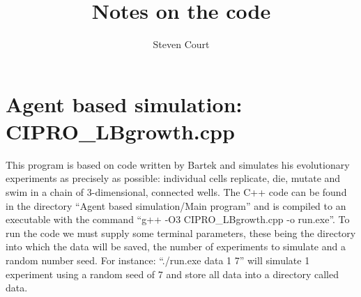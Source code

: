 \documentclass[a4paper,10pt]{article}
\title{Notes on the code}
\author{Steven Court}
\begin{document}
\maketitle



\section{Agent based simulation: CIPRO\_LBgrowth.cpp}
This program is based on code written by Bartek and simulates his evolutionary experiments as precisely as possible: individual cells replicate, die, mutate and swim in a chain 
of 3-dimensional, connected wells. The C++ code can be found in the directory ``Agent based simulation/Main program'' and is compiled
to an executable with the command ``g++ -O3 CIPRO\_LBgrowth.cpp -o run.exe''. To run the code we must supply some terminal parameters, these being the directory into which
the data will be saved, the number of experiments to simulate and a random number seed. For instance: ``./run.exe data 1 7'' will simulate 1 experiment using a random seed
of 7 and store all data into a directory called data.
\end{document}
